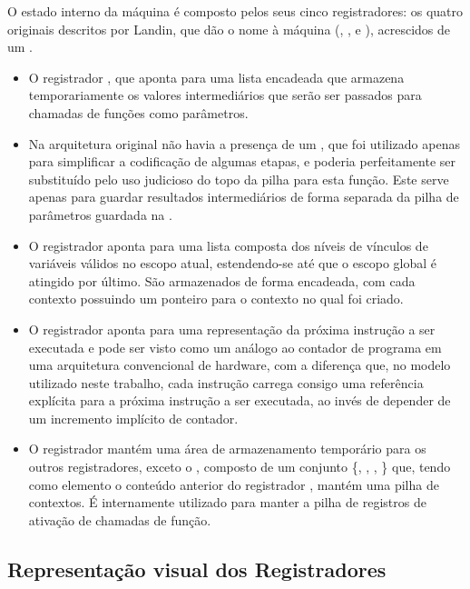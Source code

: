 O estado interno da máquina é composto pelos seus cinco registradores: os
quatro originais descritos por Landin, que dão o nome à máquina (,
,  e ), acrescidos de um
.

\begin{itemize}

\item O registrador , que aponta para uma lista encadeada que
armazena temporariamente os valores intermediários que serão ser passados para
chamadas de funções como parâmetros. 

\item Na arquitetura original não havia a presença de um , que
foi utilizado apenas para simplificar a codificação de algumas etapas, e
poderia perfeitamente ser substituído pelo uso judicioso do topo da pilha para
esta função. Este serve apenas para guardar resultados intermediários de forma
separada da pilha de parâmetros guardada na . 

\item O registrador  aponta para uma lista composta dos
níveis de vínculos de variáveis válidos no escopo atual, estendendo-se até que
o escopo global é atingido por último. São armazenados de forma encadeada, com
cada contexto possuindo um ponteiro para o contexto no qual foi criado.

\item O registrador  aponta para uma representação da próxima
instrução a ser executada e pode ser visto como um análogo ao contador de
programa em uma arquitetura convencional de hardware, com a diferença que, no
modelo utilizado neste trabalho, cada instrução carrega consigo uma referência
explícita para a próxima instrução a ser executada, ao invés de depender de um
incremento implícito de contador.

\item O registrador  mantém uma área de armazenamento temporário
para os outros registradores, exceto o , composto de um
conjunto \{, , , \} que, tendo como elemento o
conteúdo anterior do registrador , mantém uma pilha de contextos. É
internamente utilizado para manter a pilha de registros de ativação de chamadas
de função. 

\end{itemize}


\subsection{Representação visual dos Registradores}
\label{ss:registradores-visual}

